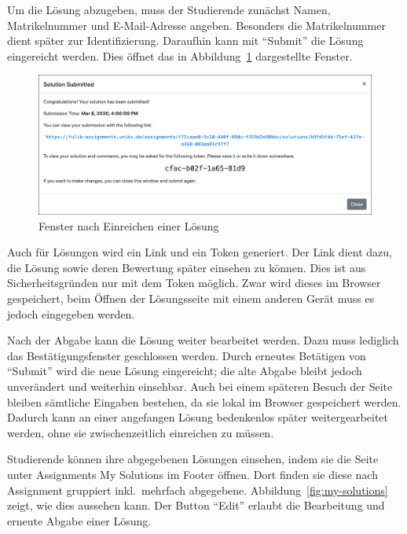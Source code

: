 Um die Lösung abzugeben, muss der Studierende zunächst Namen, Matrikelnummer und E-Mail-Adresse angeben.
Besonders die Matrikelnummer dient später zur Identifizierung.
Daraufhin kann mit ``Submit'' die Lösung eingereicht werden.
Dies öffnet das in Abbildung~\ref{fig:solution-submitted} dargestellte Fenster.

\begin{figure}
    \centering
    \includegraphics[width=\textwidth]{chapter/fulib.org/img/solution-submitted.png}
    \caption{Fenster nach Einreichen einer Lösung}
    \label{fig:solution-submitted}
\end{figure}

Auch für Lösungen wird ein Link und ein Token generiert.
Der Link dient dazu, die Lösung sowie deren Bewertung später einsehen zu können.
Dies ist aus Sicherheitsgründen nur mit dem Token möglich.
Zwar wird dieses im Browser gespeichert, beim Öffnen der Lösungsseite mit einem anderen Gerät muss es jedoch eingegeben werden.

Nach der Abgabe kann die Lösung weiter bearbeitet werden.
Dazu muss lediglich das Bestätigungsfenster geschlossen werden.
Durch erneutes Betätigen von ``Submit'' wird die neue Lösung eingereicht;
die alte Abgabe bleibt jedoch unverändert und weiterhin einsehbar.
Auch bei einem späteren Besuch der Seite bleiben sämtliche Eingaben bestehen, da sie lokal im Browser gespeichert werden.
Dadurch kann an einer angefangen Lösung bedenkenlos später weitergearbeitet werden,
ohne sie zwischenzeitlich einreichen zu müssen.

Studierende können ihre abgegebenen Lösungen einsehen, indem sie die Seite unter Assignments \textrightarrow My Solutions im Footer öffnen.
Dort finden sie diese nach Assignment gruppiert inkl.\ mehrfach abgegebene.
Abbildung~\ref{fig:my-solutions} zeigt, wie dies aussehen kann.
Der Button ``Edit'' erlaubt die Bearbeitung und erneute Abgabe einer Lösung.

